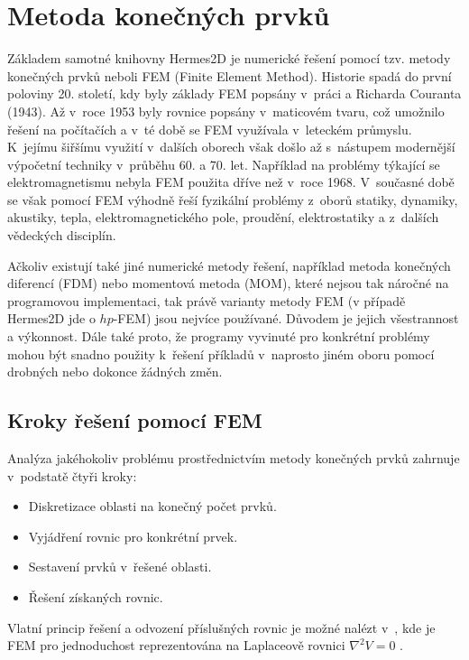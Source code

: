 \section{Metoda konečných prvků}
Základem samotné knihovny Hermes2D je numerické řešení pomocí tzv. metody konečných prvků neboli FEM (Finite Element Method). Historie spadá do první poloviny 20. století, kdy byly základy FEM popsány v~práci a Richarda Couranta (1943). Až v~roce 1953 byly rovnice popsány v~maticovém tvaru, což umožnilo řešení na počítačích a v~té době se FEM využívala v~leteckém průmyslu. K~jejímu šiřšímu využití v~dalších oborech však došlo až s~nástupem modernější výpočetní techniky v~průběhu 60. a 70. let. Například na problémy týkající se elektromagnetismu nebyla FEM použita dříve než v~roce 1968. V~současné době se však pomocí FEM výhodně řeší fyzikální problémy z~oborů statiky, dynamiky, akustiky, tepla, elektromagnetického pole, proudění, elektrostatiky a z~dalších vědeckých disciplín. 

Ačkoliv existují také jiné numerické metody řešení, například metoda konečných diferencí (FDM) nebo momentová metoda (MOM), které nejsou tak náročné na programovou implementaci, tak právě varianty metody FEM (v případě Hermes2D jde o $hp$-FEM) jsou nejvíce používané. Důvodem je jejich všestrannost a výkonnost. Dále také proto, že programy vyvinuté pro konkrétní problémy mohou být snadno použity k~řešení příkladů v~naprosto jiném oboru pomocí drobných nebo dokonce žádných změn.

\subsection{Kroky řešení pomocí FEM}
Analýza jakéhokoliv problému prostřednictvím metody konečných prvků zahrnuje v~podstatě čtyři kroky:
\begin{itemize}
\item {Diskretizace oblasti na konečný počet prvků.}
\item {Vyjádření rovnic pro konkrétní prvek.}
\item {Sestavení prvků v~řešené oblasti.}
\item {Řešení získaných rovnic.}
\end{itemize}
Vlatní princip řešení a odvození příslušných rovnic je možné nalézt v~\cite[kap. 6.2]{num}, kde je FEM pro jednoduchost reprezentována na Laplaceově rovnici $\nabla^{2}V = 0$ .

